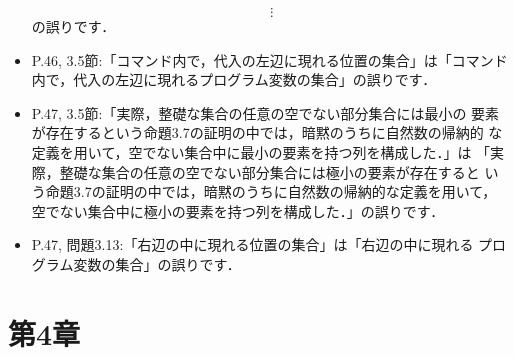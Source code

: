 \documentclass[12pt,titlepage,twoside,openright,dvipdfmx]{jsbook}
\theoremstyle{definition}
\begin{document}
\begin{itemize}
\[{      {\vdots}
    }
  \]
  の誤りです．
\item P.46, 3.5節:「コマンド内で，代入の左辺に現れる位置の集合」は「コマンド内で，代入の左辺に現れるプログラム変数の集合」の誤りです．
\item P.47, 3.5節:「実際，整礎な集合の任意の空でない部分集合には最小の
  要素が存在するという命題3.7の証明の中では，暗黙のうちに自然数の帰納的
  な定義を用いて，空でない集合中に最小の要素を持つ列を構成した．」は
  「実際，整礎な集合の任意の空でない部分集合には極小の要素が存在すると
  いう命題3.7の証明の中では，暗黙のうちに自然数の帰納的な定義を用いて，
  空でない集合中に極小の要素を持つ列を構成した．」の誤りです．
\item P.47, 問題3.13:「右辺の中に現れる位置の集合」は「右辺の中に現れる
  プログラム変数の集合」の誤りです．
\end{itemize}

\section*{第4章}
\end{document}

